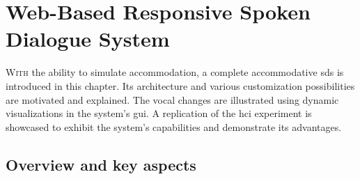 \chapter{Web-Based Responsive Spoken Dialogue System}
\label{chap:web-based_responsive_spoken_dialogue_system}

\lettrine{W}{ith} the ability to simulate accommodation, a complete accommodative \acl{sds} is introduced in this chapter.
Its architecture and various customization possibilities are motivated and explained.
The vocal changes are illustrated using dynamic visualizations in the system's \acl{gui}.
A replication of the \acl{hci} experiment is showcased to exhibit the system's capabilities and demonstrate its advantages.

\pagebreak

\acresetall

\section[Overview]{Overview and key aspects}
\label{sec:overview_and_key_aspects}

